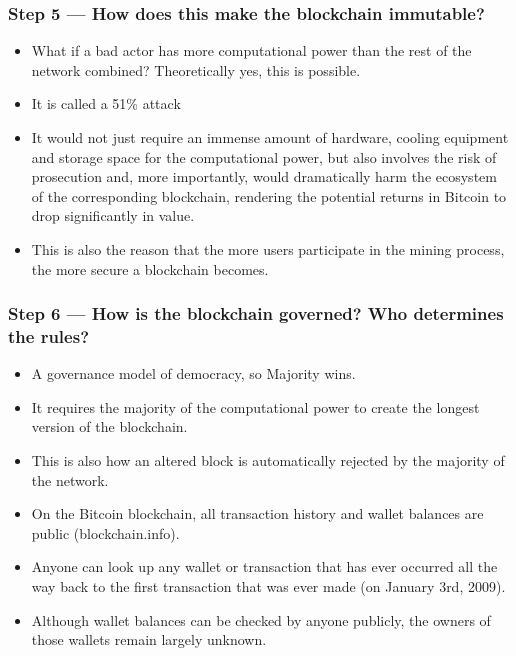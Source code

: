 \begin{frame}[fragile]\frametitle{Step 5 — How does this make the blockchain immutable?}
\begin{itemize}
\item What if a bad actor has more computational power than the rest of the network combined? Theoretically yes, this is possible. 
\item It is called a 51\% attack
\item It would not just require an immense amount of hardware, cooling equipment and storage space for the computational power, but also involves the risk of prosecution and, more importantly, would dramatically harm the ecosystem of the corresponding blockchain, rendering the potential returns in Bitcoin to drop significantly in value. 
\item This is also the reason that the more users participate in the mining process, the more secure a blockchain becomes.
\end{itemize}


\end{frame}

\begin{frame}[fragile]\frametitle{Step 6 — How is the blockchain governed? Who determines the rules?}
\begin{itemize}
\item A governance model of democracy, so Majority wins.
\item It requires the majority of the computational power to create the longest version of the blockchain. 
\item This is also how an altered block is automatically rejected by the majority of the network.
\item On the Bitcoin blockchain, all transaction history and wallet balances are public (blockchain.info). 
\item Anyone can look up any wallet or transaction that has ever occurred all the way back to the first transaction that was ever made (on January 3rd, 2009). 
\item Although wallet balances can be checked by anyone publicly, the owners of those wallets remain largely unknown.
\end{itemize}


\end{frame}

